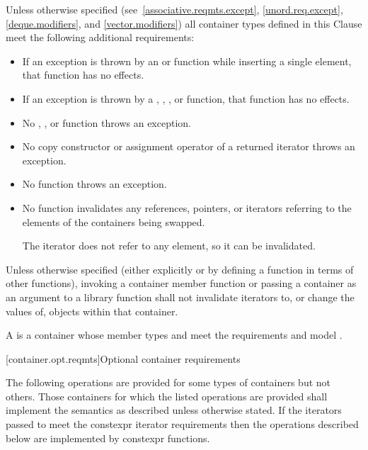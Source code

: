 \pnum
Unless otherwise specified (see~\ref{associative.reqmts.except}, \ref{unord.req.except}, \ref{deque.modifiers}, and
\ref{vector.modifiers})
all container types defined in this Clause meet
the following additional requirements:

\begin{itemize}
\item
If an exception is thrown by an
 or 
function while inserting a single element, that
function has no effects.
\item
If an exception is thrown by a
,
,
, or 
function, that function has no effects.
\item
No
,
,
or
function throws an exception.
\item
No copy constructor or assignment operator of a returned iterator
throws an exception.
\item
No
function throws an exception.
\item
No
function invalidates any references,
pointers, or iterators referring to the elements
of the containers being swapped.
\begin{note}
The  iterator does not refer to any element, so it can be invalidated.
\end{note}
\end{itemize}

\pnum
Unless otherwise specified (either explicitly or by defining a
function in terms of other functions), invoking a container member
function or passing a container as an argument to a library function
shall not invalidate iterators to, or change the values of, objects
within that container.

\pnum
A 
is a container
whose member types  and 
meet the
 requirements and
model .

[container.opt.reqmts]{Optional container requirements}

\pnum
The following operations are provided
for some types of containers but not others. Those containers for which the
listed operations are provided shall implement the semantics as described
unless otherwise stated.
If the iterators passed to 
meet the constexpr iterator requirements
then the operations described below
are implemented by constexpr functions.

